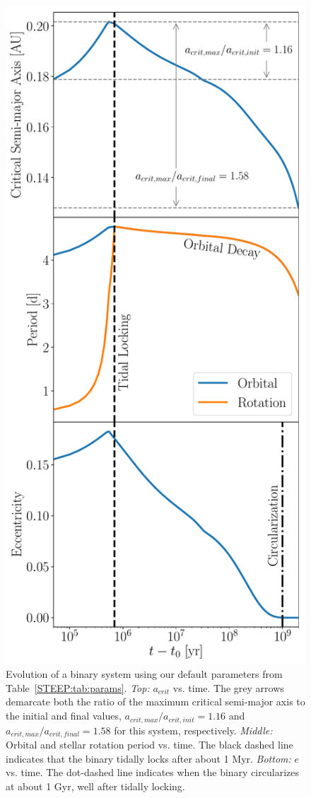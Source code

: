 \begin{figure}
	\includegraphics[scale=0.5]{example.pdf}
   \caption{Evolution of a binary system using our default parameters from Table~\ref{STEEP:tab:params}.  {\it Top:} $a_{crit}$ vs. time.  The grey arrows demarcate both the ratio of the maximum critical semi-major axis to the initial and final values, $a_{crit,max}/a_{crit,init} = 1.16$ and $a_{crit,max}/a_{crit,final} = 1.58$ for this system, respectively. {\it Middle:} Orbital and stellar rotation period vs. time.  The black dashed line indicates that the binary tidally locks after about 1 Myr.  {\it Bottom:} $e$ vs. time.  The dot-dashed line indicates when the binary circularizes at about 1 Gyr, well after tidally locking.}
    \label{STEEP:fig:example}
\end{figure}

